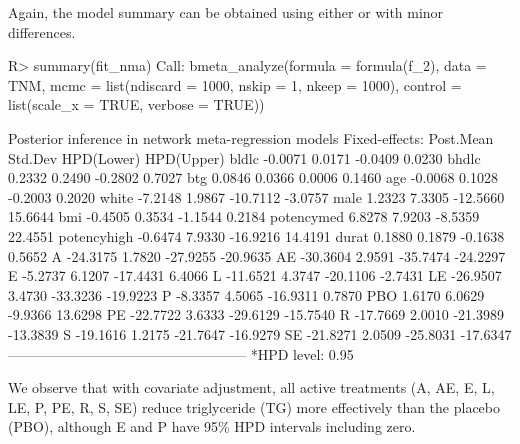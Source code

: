 Again, the model summary can be obtained using either  or  with minor differences.
\begin{example}
R> summary(fit_nma)
Call:
bmeta_analyze(formula = formula(f_2), data = TNM, mcmc = list(ndiscard = 1000, 
    nskip = 1, nkeep = 1000), control = list(scale_x = TRUE, 
    verbose = TRUE))

Posterior inference in network meta-regression models
Fixed-effects:
             Post.Mean  Std.Dev  HPD(Lower)  HPD(Upper)
bldlc          -0.0071   0.0171     -0.0409      0.0230
bhdlc           0.2332   0.2490     -0.2802      0.7027
btg             0.0846   0.0366      0.0006      0.1460
age            -0.0068   0.1028     -0.2003      0.2020
white          -7.2148   1.9867    -10.7112     -3.0757
male            1.2323   7.3305    -12.5660     15.6644
bmi            -0.4505   0.3534     -1.1544      0.2184
potencymed      6.8278   7.9203     -8.5359     22.4551
potencyhigh    -0.6474   7.9330    -16.9216     14.4191
durat           0.1880   0.1879     -0.1638      0.5652
A             -24.3175   1.7820    -27.9255    -20.9635
AE            -30.3604   2.9591    -35.7474    -24.2297
E              -5.2737   6.1207    -17.4431      6.4066
L             -11.6521   4.3747    -20.1106     -2.7431
LE            -26.9507   3.4730    -33.3236    -19.9223
P              -8.3357   4.5065    -16.9311      0.7870
PBO             1.6170   6.0629     -9.9366     13.6298
PE            -22.7722   3.6333    -29.6129    -15.7540
R             -17.7669   2.0010    -21.3989    -13.3839
S             -19.1616   1.2175    -21.7647    -16.9279
SE            -21.8271   2.0509    -25.8031    -17.6347
---------------------------------------------------
*HPD level:  0.95
\end{example}
{\color{black}We observe that with covariate adjustment, all active treatments (A, AE, E, L, LE, P, PE, R, S, SE) reduce triglyceride (TG) more effectively than the placebo (PBO), although E and P have 95\% HPD intervals including zero.}

